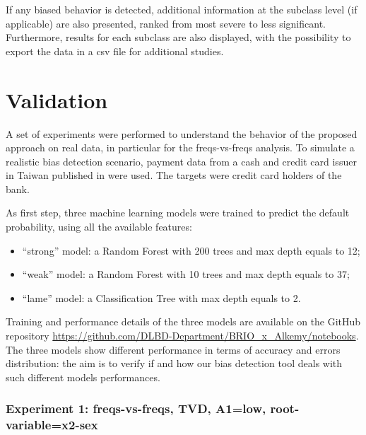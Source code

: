 \documentclass[
]{ceurart}
\begin{document}
If any biased behavior is detected, additional information at the subclass level (if applicable) are also presented, ranked from most severe to less significant. Furthermore, results for each subclass are also displayed, with the possibility to export the data in a csv file for additional studies. 

\section{Validation}
\label{sec:validation}

A set of experiments were performed to understand the behavior of the proposed approach on real data, in particular for the freqs-vs-freqs analysis. To simulate a realistic bias detection scenario, payment data from a cash and credit card issuer in Taiwan published in \cite{YEH20092473} were used. The targets were credit card holders of the bank. 

As first step, three machine learning models were trained to predict the default probability, using all the available features:

\begin{itemize}
  \item ``strong'' model: a Random Forest with 200 trees and max depth equals to 12;
  \item ``weak'' model: a Random Forest with 10 trees and max depth equals to 37;
  \item ``lame'' model: a Classification Tree with max depth equals to 2.
\end{itemize}

Training and performance details of the three models are available on the GitHub repository \url{https://github.com/DLBD-Department/BRIO_x_Alkemy/notebooks}. The three models show different performance in terms of accuracy and errors distribution: the aim is to verify if and how our bias detection tool deals with such different models performances. 

\subsubsection{Experiment 1: freqs-vs-freqs, TVD, A1=low, root-variable=x2-sex}
\end{document}
